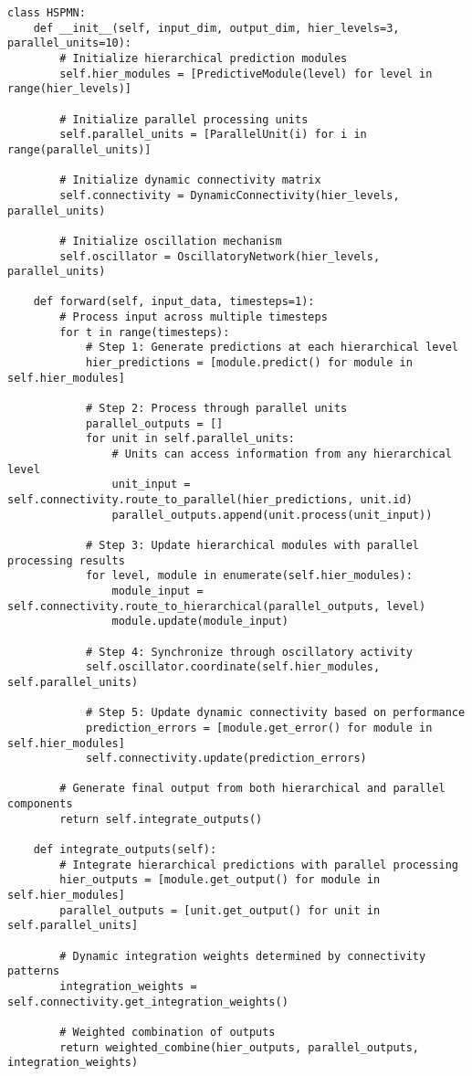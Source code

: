 \documentclass[11pt,a4paper,twocolumn]{article}
\begin{document}
\begin{lstlisting}[caption={Core HSPMN Implementation}, label={lst:hspmn-core}]
class HSPMN:
    def __init__(self, input_dim, output_dim, hier_levels=3, parallel_units=10):
        # Initialize hierarchical prediction modules
        self.hier_modules = [PredictiveModule(level) for level in range(hier_levels)]

        # Initialize parallel processing units
        self.parallel_units = [ParallelUnit(i) for i in range(parallel_units)]

        # Initialize dynamic connectivity matrix
        self.connectivity = DynamicConnectivity(hier_levels, parallel_units)

        # Initialize oscillation mechanism
        self.oscillator = OscillatoryNetwork(hier_levels, parallel_units)

    def forward(self, input_data, timesteps=1):
        # Process input across multiple timesteps
        for t in range(timesteps):
            # Step 1: Generate predictions at each hierarchical level
            hier_predictions = [module.predict() for module in self.hier_modules]

            # Step 2: Process through parallel units
            parallel_outputs = []
            for unit in self.parallel_units:
                # Units can access information from any hierarchical level
                unit_input = self.connectivity.route_to_parallel(hier_predictions, unit.id)
                parallel_outputs.append(unit.process(unit_input))

            # Step 3: Update hierarchical modules with parallel processing results
            for level, module in enumerate(self.hier_modules):
                module_input = self.connectivity.route_to_hierarchical(parallel_outputs, level)
                module.update(module_input)

            # Step 4: Synchronize through oscillatory activity
            self.oscillator.coordinate(self.hier_modules, self.parallel_units)

            # Step 5: Update dynamic connectivity based on performance
            prediction_errors = [module.get_error() for module in self.hier_modules]
            self.connectivity.update(prediction_errors)

        # Generate final output from both hierarchical and parallel components
        return self.integrate_outputs()

    def integrate_outputs(self):
        # Integrate hierarchical predictions with parallel processing
        hier_outputs = [module.get_output() for module in self.hier_modules]
        parallel_outputs = [unit.get_output() for unit in self.parallel_units]

        # Dynamic integration weights determined by connectivity patterns
        integration_weights = self.connectivity.get_integration_weights()

        # Weighted combination of outputs
        return weighted_combine(hier_outputs, parallel_outputs, integration_weights)
\end{lstlisting}
\end{document}
